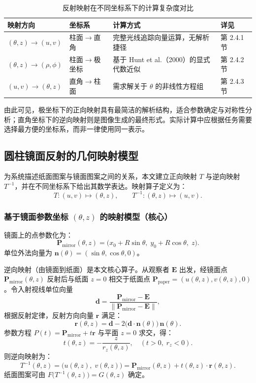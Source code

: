 \documentclass[12pt, a4paper]{ctexart}
\begin{document}
\begin{table}[htbp]
\centering
\caption{反射映射在不同坐标系下的计算复杂度对比}
\label{tab:coord-compare}
\begin{tabularx}{\textwidth}{lllX}
\toprule
\textbf{映射方向} & \textbf{坐标系} & \textbf{计算方式} & \textbf{详见} \\
\midrule
$(\theta,z)\to(u,v)$ & 柱面$\to$直角 & 完整光线追踪向量运算，无解析捷径 & 第 2.4.1 节 \\
$(\theta,z)\to(\rho,\phi)$ & 柱面$\to$极坐标 & 基于 Hunt et al.（2000）的显式代数近似 & 第 2.4.2 节 \\
$(u,v)\to(\theta,z)$ & 直角$\to$柱面 & 需求解关于 $\theta$ 的非线性方程组 & 第 2.4.3 节 \\
\bottomrule
\end{tabularx}
\end{table}

由此可见，极坐标下的正向映射具有最简洁的解析结构，适合参数确定与对称性分析；直角坐标下的逆向映射则是图像生成的最终形式。实际计算中应根据任务需要选择最方便的坐标系，而非一律使用同一表示。

\subsection{圆柱镜面反射的几何映射模型}

为系统描述纸面图案与镜面图案之间的关系，本文建立正向映射 $T$ 与逆向映射 $T^{-1}$，并在不同坐标系下给出其数学表达。映射算子定义为：
\[
T:(u,v)\mapsto(\theta,z),\qquad T^{-1}:(\theta,z)\mapsto(u,v).
\]

\subsubsection{基于镜面参数坐标 \texorpdfstring{$(\theta,z)$}{(theta,z)} 的映射模型（核心）}

镜面上的点参数化为：
\[
\mathbf{P}_{\mathrm{mirror}}(\theta,z)=\bigl(x_0+R\sin\theta,\;y_0+R\cos\theta,\;z\bigr).
\]
单位外法向量为 $\mathbf{n}(\theta)=(\sin\theta,\cos\theta,0)$。

逆向映射（由镜面到纸面）是本文核心算子。从观察者 $\mathbf{E}$ 出发，经镜面点 $\mathbf{P}_{\mathrm{mirror}}(\theta,z)$ 反射后与纸面 $z=0$ 相交于纸面点 $\mathbf{P}_{\mathrm{paper}}=(u(\theta,z),v(\theta,z),0)$。令入射视线单位向量
\[
\mathbf{d}=\frac{\mathbf{P}_{\mathrm{mirror}}-\mathbf{E}}{\lVert\mathbf{P}_{\mathrm{mirror}}-\mathbf{E}\rVert},
\]
根据反射定律，反射方向向量 $\mathbf{r}$ 满足：
\[
\mathbf{r}(\theta,z)=\mathbf{d}-2\bigl(\mathbf{d}\cdot\mathbf{n}(\theta)\bigr)\,\mathbf{n}(\theta).
\]
参数方程 $P(t)=\mathbf{P}_{\mathrm{mirror}}+t\mathbf{r}$ 与平面 $z=0$ 求交，得：
\[
t(\theta,z)=-\frac{z}{r_z(\theta,z)},\quad(t>0,\;r_z<0).
\]
则逆向映射为：
\[
T^{-1}(\theta,z)=\bigl(u(\theta,z),\;v(\theta,z)\bigr)=\mathbf{P}_{\mathrm{mirror}}(\theta,z)+t(\theta,z)\cdot\mathbf{r}(\theta,z).
\]
纸面图案可由 $F\bigl(T^{-1}(\theta,z)\bigr)=G(\theta,z)$ 确定。
\end{document}

